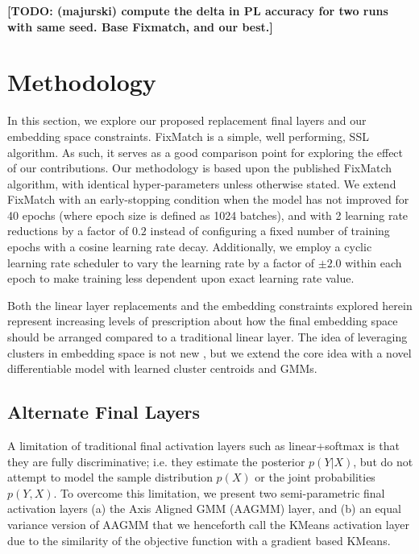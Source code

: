 \documentclass[10pt,twocolumn,letterpaper]{article}
\newcommand{\TODO}[1]{\textbf{\color{red}[TODO: #1]}}
\begin{document}


\TODO {(majurski) compute the delta in PL accuracy for two runs with same seed. Base Fixmatch, and our best.}

\section{Methodology}

In this section, we explore our proposed replacement final layers and our embedding space constraints.
FixMatch \cite{sohn2020fixmatch} is a simple, well performing, SSL algorithm.
As such, it serves as a good comparison point for exploring the effect of our contributions.
Our methodology is based upon the published FixMatch \cite{sohn2020fixmatch} algorithm, with identical hyper-parameters unless otherwise stated.
We extend FixMatch with an early-stopping condition when the model has not improved for 40 epochs (where epoch size is defined as 1024 batches), and with 2 learning rate reductions by a factor of $0.2$ instead of configuring a fixed number of training epochs with a cosine learning rate decay.
Additionally, we employ a cyclic learning rate scheduler to vary the learning rate by a factor of $\pm2.0$ within each epoch to make training less dependent upon exact learning rate value.

Both the linear layer replacements and the embedding constraints explored herein represent increasing levels of prescription about how the final embedding space should be arranged compared to a traditional linear layer.
The idea of leveraging clusters in embedding space is not new \cite{caron2018deep,caron2020unsupervised,enguehard2019semi}, but we extend the core idea with a novel differentiable model with learned cluster centroids and GMMs.

\subsection{Alternate Final Layers}

A limitation of traditional final activation layers such as linear+softmax is that they are fully discriminative; i.e. they estimate the posterior $p(Y|X)$, but do not attempt to model the sample distribution $p(X)$ or the joint probabilities $p(Y,X)$. 
To overcome this limitation, we present two semi-parametric final activation layers (a) the Axis Aligned GMM (AAGMM) layer, and (b) an equal variance version of AAGMM that we henceforth call the KMeans activation layer due to the similarity of the objective function with a gradient based KMeans.
\end{document}
